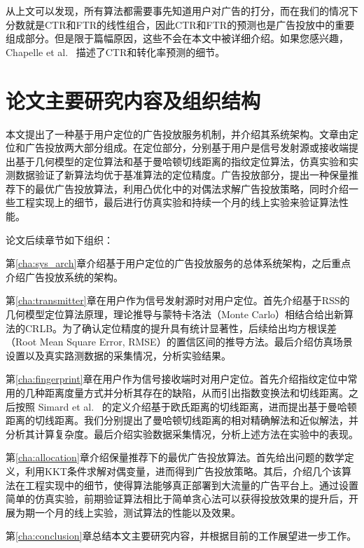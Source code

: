从上文可以发现，所有算法都需要事先知道用户对广告的打分，而在我们的情况下分数就是CTR和FTR的线性组合，因此CTR和FTR的预测也是广告投放中的重要组成部分。但是限于篇幅原因，这些不会在本文中被详细介绍。如果您感兴趣，Chapelle et al.~\cite{chapelle2015simple} 描述了CTR和转化率预测的细节。

\section{论文主要研究内容及组织结构}

本文提出了一种基于用户定位的广告投放服务机制，并介绍其系统架构。文章由定位和广告投放两大部分组成。在定位部分，分别基于用户是信号发射源或接收端提出基于几何模型的定位算法和基于曼哈顿切线距离的指纹定位算法，仿真实验和实测数据验证了新算法均优于基准算法的定位精度。广告投放部分，提出一种保量推荐下的最优广告投放算法，利用凸优化中的对偶法求解广告投放策略，同时介绍一些工程实现上的细节，最后进行仿真实验和持续一个月的线上实验来验证算法性能。

论文后续章节如下组织：

第\ref{cha:sys_arch}章介绍基于用户定位的广告投放服务的总体系统架构，之后重点介绍广告投放系统的架构。

第\ref{cha:transmitter}章在用户作为信号发射源时对用户定位。首先介绍基于RSS的几何模型定位算法原理，理论推导与蒙特卡洛法（Monte Carlo）相结合给出新算法的CRLB。为了确认定位精度的提升具有统计显著性，后续给出均方根误差（Root Mean Square Error, RMSE）的置信区间的推导方法。最后介绍仿真场景设置以及真实路测数据的采集情况，分析实验结果。

第\ref{cha:fingerprint}章在用户作为信号接收端时对用户定位。首先介绍指纹定位中常用的几种距离度量方式并分析其存在的缺陷，从而引出指数变换法和切线距离。之后按照 Simard et al.~\cite{simard1998transformation} 的定义介绍基于欧氏距离的切线距离，进而提出基于曼哈顿距离的切线距离。我们分别提出了曼哈顿切线距离的相对精确解法和近似解法，并分析其计算复杂度。最后介绍实验数据采集情况，分析上述方法在实验中的表现。

第\ref{cha:allocation}章介绍保量推荐下的最优广告投放算法。首先给出问题的数学定义，利用KKT条件求解对偶变量，进而得到广告投放策略。其后，介绍几个该算法在工程实现中的细节，使得算法能够真正部署到大流量的广告平台上。通过设置简单的仿真实验，前期验证算法相比于简单贪心法可以获得投放效果的提升后，开展为期一个月的线上实验，测试算法的性能以及效果。

第\ref{cha:conclusion}章总结本文主要研究内容，并根据目前的工作展望进一步工作。


